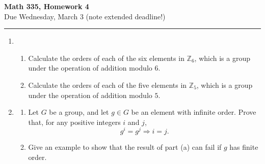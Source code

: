 \documentclass[11pt,twoside]{article}
\begin{document}
\begin{center}
{\bf \Large Math 335, Homework 4}\\
\vspace{0.1in}
{\Large Due Wednesday, March 3 (note extended deadline!)}
\vspace{0.1cm}
\end{center}

\hrule

\vspace{.2in}

\begin{enumerate}

\item

\begin{enumerate}[label=(\alph*)]

\item Calculate the orders of each of the six elements in $\mathbb{Z}_6$, which is a group under the operation of addition modulo $6$.

\vspace{0.25cm}

\item Calculate the orders of each of the five elements in $\mathbb{Z}_5$, which is a group under the operation of addition modulo $5$.

\end{enumerate}

\vspace{0.5cm}

%

\item \label{infiniteorder}
\begin{enumerate}[label=(\alph*)]

\item Let $G$ be a group, and let $g \in G$ be an element with infinite order.  Prove that, for any positive integers $i$ and $j$,
\[g^i = g^j \Rightarrow i = j.\]

\vspace{0.25cm}

\item Give an example to show that the result of part (a) can fail if $g$ has finite order.

\vspace{0.5cm}

\end{enumerate}


\end{enumerate}
\end{document}
